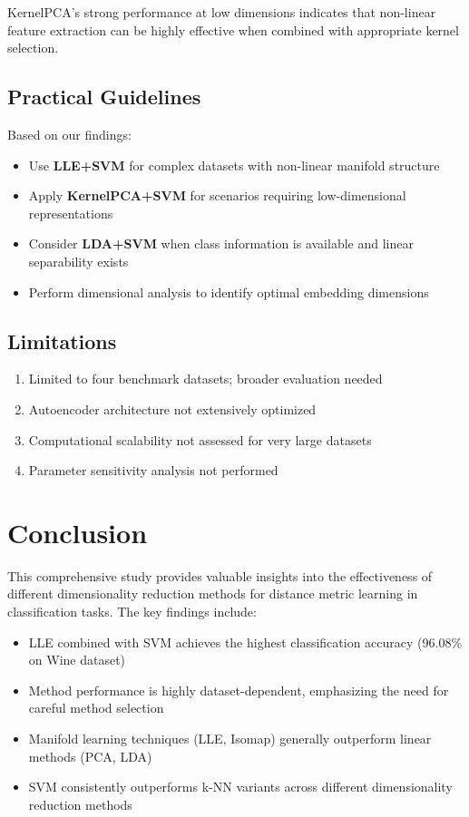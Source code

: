 \documentclass[12pt,a4paper]{article}
\begin{document}
KernelPCA's strong performance at low dimensions indicates that non-linear feature extraction can be highly effective when combined with appropriate kernel selection.

\subsection{Practical Guidelines}

Based on our findings:
\begin{itemize}
    \item Use \textbf{LLE+SVM} for complex datasets with non-linear manifold structure
    \item Apply \textbf{KernelPCA+SVM} for scenarios requiring low-dimensional representations  
    \item Consider \textbf{LDA+SVM} when class information is available and linear separability exists
    \item Perform dimensional analysis to identify optimal embedding dimensions
\end{itemize}

\subsection{Limitations}

\begin{enumerate}
    \item Limited to four benchmark datasets; broader evaluation needed
    \item Autoencoder architecture not extensively optimized
    \item Computational scalability not assessed for very large datasets
    \item Parameter sensitivity analysis not performed
\end{enumerate}

\section{Conclusion}

This comprehensive study provides valuable insights into the effectiveness of different dimensionality reduction methods for distance metric learning in classification tasks. The key findings include:

\begin{itemize}
    \item LLE combined with SVM achieves the highest classification accuracy (96.08\% on Wine dataset)
    \item Method performance is highly dataset-dependent, emphasizing the need for careful method selection
    \item Manifold learning techniques (LLE, Isomap) generally outperform linear methods (PCA, LDA)
    \item SVM consistently outperforms k-NN variants across different dimensionality reduction methods
\end{itemize}
\end{document}
